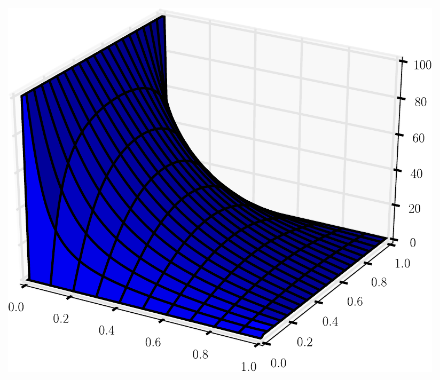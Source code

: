 \begin{problem}
\begin{figure}[H]
\includegraphics[width=.75\textwidth]{laplace.pdf}
\end{figure}
\end{problem}

